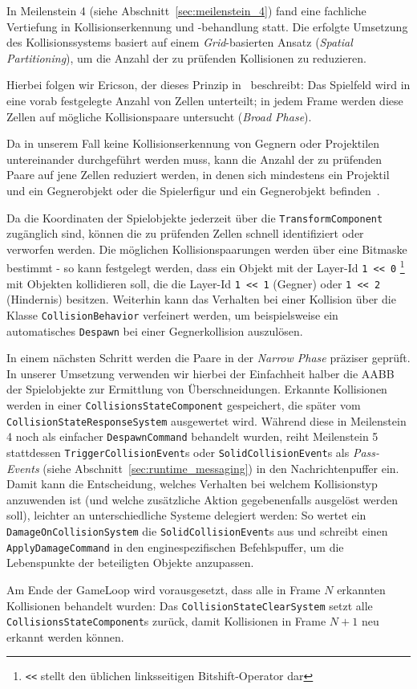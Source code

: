 \begin{tcolorbox}[title={Exkurs: Kollisionserkennungssystem}, colback=black!5, colframe=black]
    In Meilenstein 4 (siehe Abschnitt~\ref{sec:meilenstein_4}) fand eine fachliche Vertiefung in Kollisionserkennung und -behandlung statt.
Die erfolgte Umsetzung des Kollisionssystems basiert auf einem \textit{Grid}-basierten Ansatz (\textit{Spatial Partitioning}), um die Anzahl der zu prüfenden Kollisionen zu reduzieren.

Hierbei folgen wir Ericson, der dieses Prinzip in~\cite[Kapitel 4]{Eri04} beschreibt:
Das Spielfeld wird in eine vorab festgelegte Anzahl von Zellen unterteilt; in jedem Frame werden diese Zellen auf mögliche Kollisionspaare untersucht (\textit{Broad Phase}).

Da in unserem Fall keine Kollisionserkennung von Gegnern oder Projektilen untereinander durchgeführt werden muss, kann die Anzahl der zu prüfenden Paare auf jene Zellen reduziert werden, in denen sich mindestens ein Projektil und ein Gegnerobjekt oder die Spielerfigur und ein Gegnerobjekt befinden~\cite[S.~285]{Eri04}.

Da die Koordinaten der Spielobjekte jederzeit über die \texttt{TransformComponent} zugänglich sind, können die zu prüfenden Zellen schnell identifiziert oder verworfen werden.
Die möglichen Kollisionspaarungen werden über eine Bitmaske bestimmt - so kann festgelegt werden, dass ein Objekt mit der Layer-Id \texttt{1 <{<} 0} \footnote{
        \texttt{<{<}} stellt den üblichen linksseitigen Bitshift-Operator dar
} mit Objekten kollidieren soll, die die Layer-Id \texttt{1 <{<} 1} (Gegner) oder \texttt{1 <{<} 2} (Hindernis) besitzen.
Weiterhin kann das Verhalten bei einer Kollision über die Klasse \texttt{CollisionBehavior} verfeinert werden, um beispielsweise ein automatisches \texttt{Despawn} bei einer Gegnerkollision auszulösen.

In einem nächsten Schritt werden die Paare in der \textit{Narrow Phase} präziser geprüft.
In unserer Umsetzung verwenden wir hierbei der Einfachheit halber die AABB der Spielobjekte zur Ermittlung von Überschneidungen.
Erkannte Kollisionen werden in einer \texttt{CollisionsStateComponent} gespeichert, die später vom \texttt{CollisionStateResponseSystem} ausgewertet wird.
Während diese in Meilenstein 4 noch als einfacher \texttt{DespawnCommand} behandelt wurden, reiht Meilenstein 5 stattdessen \texttt{TriggerCollisionEvent}s oder \texttt{SolidCollisionEvent}s als \textit{Pass-Events} (siehe Abschnitt~\ref{sec:runtime_messaging}) in den Nachrichtenpuffer ein.
Damit kann die Entscheidung, welches Verhalten bei welchem Kollisionstyp anzuwenden ist (und welche zusätzliche Aktion gegebenenfalls ausgelöst werden soll), leichter an unterschiedliche Systeme delegiert werden: So wertet ein \texttt{DamageOnCollisionSystem} die \texttt{SolidCollisionEvent}s aus und schreibt einen \texttt{ApplyDamageCommand} in den enginespezifischen Befehlspuffer, um die Lebenspunkte der beteiligten Objekte anzupassen.

Am Ende der GameLoop wird vorausgesetzt, dass alle in Frame $N$ erkannten Kollisionen behandelt wurden:
Das \texttt{CollisionStateClearSystem} setzt alle \texttt{CollisionsStateComponent}s zurück, damit Kollisionen in Frame $N+1$ neu erkannt werden können.
\end{tcolorbox}
